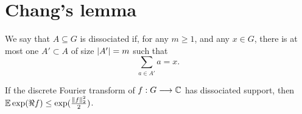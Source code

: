 \chapter{Chang's lemma}

\begin{definition}[Dissociation]
\label{dissociated}
\leanok
We say that $A\subseteq G$ is dissociated if, for any $m\geq 1$, and any $x\in G$, there is at most one $A'\subset A$ of size $\left\lvert A'\right\rvert=m$ such that
\[\sum_{a\in A'}a=x.\]
\end{definition}


\begin{lemma}
\label{rudin_exp}
\leanok
If the discrete Fourier transform of $f : G \longrightarrow \mathbb{C}$ has dissociated support, then $\mathbb{E} \exp(\Re f) \le \exp(\frac{\lVert f\rVert_2^2} 2)$.
\end{lemma}

